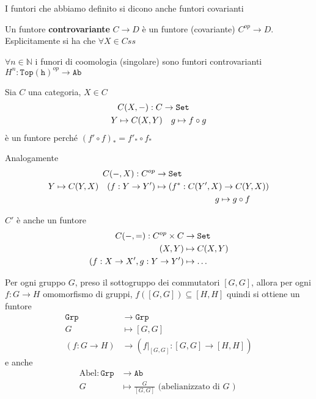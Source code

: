 \begin{remark}{}
    I funtori che abbiamo definito si dicono anche funtori covarianti
\end{remark}
\begin{definition}{}
    Un funtore \textbf{controvariante} \(C \to D\) è un funtore (covariante) \(C^{op} \to D\).
    Esplicitamente si ha che \(\forall X \in Css\) %
\end{definition}
\begin{example}{}
    \(\forall n \in \mathbb{N}\) i funori di coomologia (singolare) sono funtori
    controvarianti \(H^{n} : \mathtt{Top(h)}^{op} \to \mathtt{Ab}\) 
\end{example}
\begin{example}{}
    Sia \(C\) una categoria, \(X \in C\)
    \begin{align*}
        C{(X, \--)} : C &\to \mathtt{Set} \\
        Y \mapsto C{(X, Y)} &\quad g \mapsto f \circ g
    \end{align*}
    è un funtore perché \({(f' \circ f)}_* = f'_* \circ f_*\) 

    Analogamente 
    \begin{align*}
        C{(\--, X)} : C^{op} &\to \mathtt{Set} \\
        Y \mapsto C{(Y, X)} \quad {(f : Y \to Y')} &\mapsto {(f^{*} : C{(Y', X)} \to C{(Y, X)})} \\
            & \quad \quad \quad \quad\quad\quad\quad  g \mapsto g \circ f
    \end{align*}
\end{example}
\begin{remark}{}
    \(C'\) è anche un funtore 
    \begin{align*}
        C{(\--, =)} : C^{op} \times C &\to \mathtt{Set} \\
        {(X, Y)} &\mapsto C{(X, Y)} \\
        {(f : X \to X', g : Y \to Y')} &\mapsto \dots
    \end{align*}
\end{remark}
\begin{example}{}
    Per ogni gruppo \(G\), preso il sottogruppo dei commutatori \([G, G]\),
    allora per ogni \(f : G \to H\) omomorfismo di gruppi, \(f{([G, G])} \subseteq [H, H] \) 
    quindi si ottiene un funtore
    \begin{align*}{}
        \mathtt{Grp} &\to \mathtt{Grp} \\
        G &\mapsto [G, G] \\
        {(f : G \to H)} &\to {(f |_{[G, G]} : [G, G] \to [H, H] )}
    \end{align*}
    e anche 
    \begin{align*}
        \mathrm{Abel} : \mathtt{Grp} &\to \mathtt{Ab} \\
        G &\mapsto \frac{G}{[G, G]} \text{ (abelianizzato di \(G\) ) }
    \end{align*}
\end{example}

